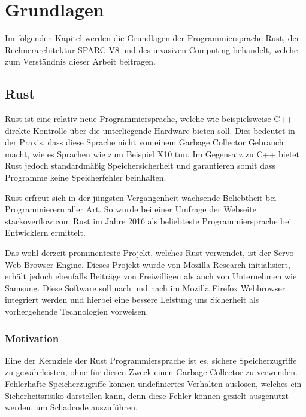 \chapter{Grundlagen}\label{sec:basics}

Im folgenden Kapitel werden die Grundlagen der Programmiersprache Rust, der Rechnerarchitektur SPARC-V8 und des 
invasiven Computing behandelt, welche zum Verständnis dieser Arbeit beitragen.

\section{Rust}

Rust ist eine relativ neue Programmiersprache, welche wie beispielsweise C++ direkte Kontrolle über die
unterliegende Hardware bieten soll. Dies bedeutet in der Praxis, dass diese Sprache nicht von einem Garbage
Collector Gebrauch macht, wie es Sprachen wie zum Beispiel X10 tun. Im Gegensatz zu C++ bietet Rust jedoch
standardmäßig Speichersicherheit und garantieren somit dass Programme keine Speicherfehler beinhalten.
\cite{theRustLanguage}

Rust erfreut sich in der jüngsten Vergangenheit wachsende Beliebtheit bei Programmierern aller Art. So wurde
bei einer Umfrage der Webseite stackoverflow.com Rust im Jahre 2016 als beliebteste Programmiersprache bei 
Entwicklern ermittelt\cite{stackoverflowSurvey}.

Das wohl derzeit prominenteste Projekt, welches Rust verwendet, ist der Servo Web Browser Engine. Dieses Projekt
wurde von Mozilla Research initialisiert, erhält jedoch ebenfalls Beiträge von Freiwilligen
als auch von Unternehmen wie Samsung.
Diese Software soll nach und nach im Mozilla Firefox Webbrowser integriert werden und hierbei eine bessere
Leistung uns Sicherheit als vorhergehende Technologien vorweisen\cite{engineeringServo}.

\subsection{Motivation}

Eine der Kernziele der Rust Programmiersprache ist es, sichere Speicherzugriffe zu gewährleisten, ohne
für diesen Zweck einen Garbage Collector zu verwenden. Fehlerhafte Speicherzugriffe können undefiniertes
Verhalten auslösen, welches ein Sicherheitsrisiko darstellen kann, denn diese Fehler können gezielt ausgenutzt
werden, um Schadcode auszuführen.\cite{engineeringServo}\cite{undefinedBehaviour}

